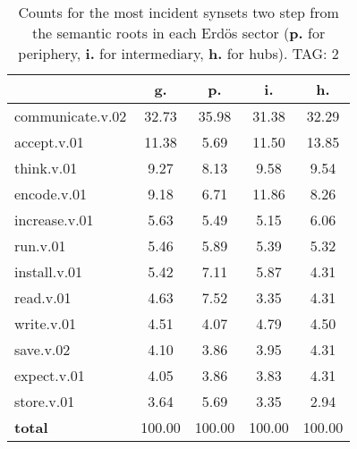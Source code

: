 \begin{table}[h!]
\begin{center}
\begin{tabular}{| l || c | c | c | c |}\hline
 & {\bf g.} & {\bf p.} & {\bf i.} & {\bf h.} \\\hline\hline
communicate.v.02 & 32.73  & 35.98  & 31.38  & 32.29 \\\hline
accept.v.01 & 11.38  & 5.69  & 11.50  & 13.85 \\\hline
think.v.01 & 9.27  & 8.13  & 9.58  & 9.54 \\\hline
encode.v.01 & 9.18  & 6.71  & 11.86  & 8.26 \\\hline
increase.v.01 & 5.63  & 5.49  & 5.15  & 6.06 \\\hline
run.v.01 & 5.46  & 5.89  & 5.39  & 5.32 \\\hline
install.v.01 & 5.42  & 7.11  & 5.87  & 4.31 \\\hline
read.v.01 & 4.63  & 7.52  & 3.35  & 4.31 \\\hline
write.v.01 & 4.51  & 4.07  & 4.79  & 4.50 \\\hline
save.v.02 & 4.10  & 3.86  & 3.95  & 4.31 \\\hline
expect.v.01 & 4.05  & 3.86  & 3.83  & 4.31 \\\hline
store.v.01 & 3.64  & 5.69  & 3.35  & 2.94 \\\hline\hline
{{\bf total}} & 100.00  & 100.00  & 100.00  & 100.00 \\\hline
\end{tabular}
\caption{Counts for the most incident synsets two step from the semantic roots in each Erd\"os sector ({\bf p.} for periphery, {\bf i.} for intermediary, {\bf h.} for hubs). TAG: 2}
\end{center}
\end{table}